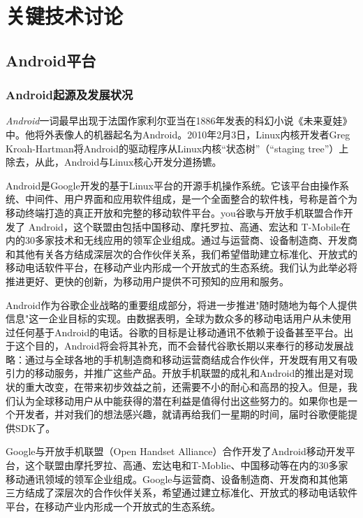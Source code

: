 \documentclass{XDBAthesis}
\begin{document}
\else
\fi
\chapter{关键技术讨论}

\section{Android平台}

\subsection{Android起源及发展状况}

\emph{Android}一词最早出现于法国作家利尔亚当在1886年发表的科幻小说《未来夏娃》中。他将外表像人的机器起名为Android。2010年2月3日，Linux内核开发者Greg Kroah-Hartman将Android的驱动程序从Linux内核“状态树”（“staging tree”）上除去，从此，Android与Linux核心开发分道扬镳。

Android是Google开发的基于Linux平台的开源手机操作系统。它该平台由操作系统、中间件、用户界面和应用软件组成，是一个全面整合的软件栈，号称是首个为移动终端打造的真正开放和完整的移动软件平台。you谷歌与开放手机联盟合作开发了 Android，这个联盟由包括中国移动、摩托罗拉、高通、宏达和 T-Mobile在内的30多家技术和无线应用的领军企业组成。通过与运营商、设备制造商、开发商和其他有关各方结成深层次的合作伙伴关系，我们希望借助建立标准化、开放式的移动电话软件平台，在移动产业内形成一个开放式的生态系统。我们认为此举必将推进更好、更快的创新，为移动用户提供不可预知的应用和服务。

Android作为谷歌企业战略的重要组成部分，将进一步推进"随时随地为每个人提供信息"这一企业目标的实现。由数据表明，全球为数众多的移动电话用户从未使用过任何基于Android的电话。谷歌的目标是让移动通讯不依赖于设备甚至平台。出于这个目的，Android将会将其补充，而不会替代谷歌长期以来奉行的移动发展战略：通过与全球各地的手机制造商和移动运营商结成合作伙伴，开发既有用又有吸引力的移动服务，并推广这些产品。开放手机联盟的成礼和Android的推出是对现状的重大改变，在带来初步效益之前，还需要不小的耐心和高昂的投入。但是，我们认为全球移动用户从中能获得的潜在利益是值得付出这些努力的。如果你也是一个开发者，并对我们的想法感兴趣，就请再给我们一星期的时间，届时谷歌便能提供SDK了。

Google与开放手机联盟（Open Handset Alliance）合作开发了Android移动开发平台，这个联盟由摩托罗拉、高通、宏达电和T-Moblie、中国移动等在内的30多家移动通讯领域的领军企业组成。Google与运营商、设备制造商、开发商和其他第三方结成了深层次的合作伙伴关系，希望通过建立标准化、开放式的移动电话软件平台，在移动产业内形成一个开放式的生态系统。    
\end{document}
